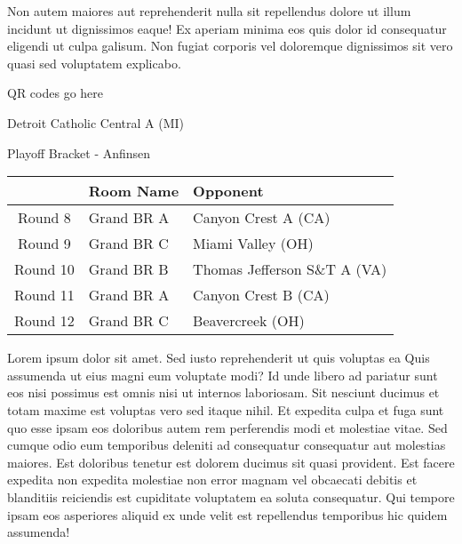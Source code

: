 \documentclass{article}%
\begin{document}
\newline%
Non autem maiores aut reprehenderit nulla sit repellendus dolore ut illum incidunt ut dignissimos eaque! Ex aperiam minima eos quis dolor id consequatur eligendi ut culpa galisum. Non fugiat corporis vel doloremque dignissimos sit vero quasi sed voluptatem explicabo.\newline%
\newline%
%
\vspace*{30pt}%
\begin{center}%
\begin{Huge}%
QR codes go here%
\end{Huge}%
\end{center}%
\newpage%
\begin{center}%
\begin{Huge}%
Detroit Catholic Central A (MI)%
\end{Huge}%
\vspace*{8pt}%
\linebreak%
\begin{Large}%
Playoff Bracket {-} Anfinsen%
\end{Large}%
\end{center}%
\begin{tabularx}{\textwidth}{|c|Y|Y|}%
\hline%
&Room Name&Opponent\\%
\hline%
Round 8&Grand BR A&Canyon Crest A (CA)\\%
Round 9&Grand BR C&Miami Valley (OH)\\%
Round 10&Grand BR B&Thomas Jefferson S\&T A (VA)\\%
Round 11&Grand BR A&Canyon Crest B (CA)\\%
Round 12&Grand BR C&Beavercreek (OH)\\%
\hline%
\end{tabularx}%
\vspace*{8pt}%
\linebreak%
\newline%
\newline%
Lorem ipsum dolor sit amet. Sed iusto reprehenderit ut quis voluptas ea Quis assumenda ut eius magni eum voluptate modi? Id unde libero ad pariatur sunt eos nisi possimus est omnis nisi ut internos laboriosam. Sit nesciunt ducimus et totam maxime est voluptas vero sed itaque nihil. Et expedita culpa et fuga sunt quo esse ipsam eos doloribus autem rem perferendis modi et molestiae vitae.\newline%
\newline%
Sed cumque odio eum temporibus deleniti ad consequatur consequatur aut molestias maiores. Est doloribus tenetur est dolorem ducimus sit quasi provident. Est facere expedita non expedita molestiae non error magnam vel obcaecati debitis et blanditiis reiciendis est cupiditate voluptatem ea soluta consequatur. Qui tempore ipsam eos asperiores aliquid ex unde velit est repellendus temporibus hic quidem assumenda!\newline%
\end{document}
